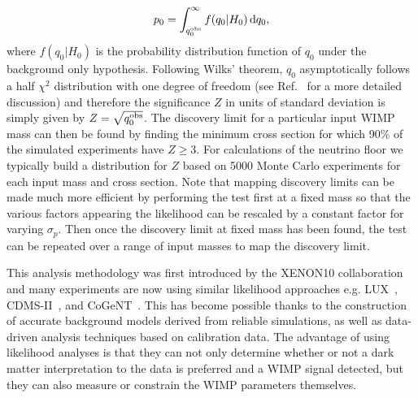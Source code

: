 \begin{equation}
p_0 = \int_{q_0^{\rm obs}}^{\infty} f(q_0|H_0) \, {\rm d} q_0, 
\end{equation}
where $f(q_0|H_0)$ is the probability distribution function of $q_0$ under the background only hypothesis. Following Wilks' theorem, $q_0$ asymptotically follows a half $\chi^2$ distribution with one degree of freedom (see Ref.~\cite{Cowan:2010js} for a more detailed discussion) and therefore the significance $Z$ in units of standard deviation is simply given by $Z = \sqrt{q^{\rm obs}_0}$. The discovery limit for a particular input WIMP mass can then be found by finding the minimum cross section for which 90\% of the simulated experiments have $Z \geq 3$. For calculations of the neutrino floor we typically build a distribution for $Z$ based on 5000 Monte Carlo experiments for each input mass and cross section. Note that mapping discovery limits can be made much more efficient by performing the test first at a fixed mass so that the various factors appearing the likelihood can be rescaled by a constant factor for varying $\sigma_p$. Then once the discovery limit at fixed mass has been found, the test can be repeated over a range of input masses to map the discovery limit.

This analysis methodology was first introduced by the XENON10 collaboration~\cite{Aprile:2011hx} and many experiments are now using similar likelihood approaches e.g. LUX~\cite{Akerib:2013tjd}, CDMS-II~\cite{Billard:2013gfa,Agnese:2014xye}, and CoGeNT~\cite{Aalseth:2014jpa}. This has become possible thanks to the construction of accurate background models derived from reliable simulations, as well as data-driven analysis techniques based on calibration data. The advantage of using likelihood analyses is that they can not only determine whether or not a dark matter interpretation to the data is preferred and a WIMP signal detected, but they can also measure or constrain the WIMP parameters themselves.